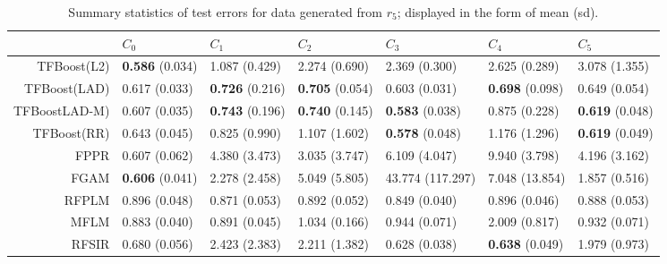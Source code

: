 \begin{table}[H]
\footnotesize
\centering
\begin{tabular}{rllllll}
  \hline
 & $C_0$ & $C_1$ & $C_2$ & $C_3$ & $C_4$ & $C_5$ \\ 
  \hline
TFBoost(L2) & \textbf{0.586} (0.034) & 1.087 (0.429) & 2.274 (0.690) & 2.369 (0.300) & 2.625 (0.289) & 3.078 (1.355) \\ 
  TFBoost(LAD) & 0.617 (0.033) & \textbf{0.726} (0.216) & \textbf{0.705} (0.054) & 0.603 (0.031) & \textbf{0.698} (0.098) & 0.649 (0.054) \\ 
  TFBoostLAD-M) & 0.607 (0.035) & \textbf{0.743} (0.196) & \textbf{0.740} (0.145) & \textbf{0.583} (0.038) & 0.875 (0.228) & \textbf{0.619} (0.048) \\ 
  TFBoost(RR) & 0.643 (0.045) & 0.825 (0.990) & 1.107 (1.602) & \textbf{0.578} (0.048) & 1.176 (1.296) & \textbf{0.619} (0.049) \\ 
  FPPR & 0.607 (0.062) & 4.380 (3.473) & 3.035 (3.747) & 6.109 (4.047) & 9.940 (3.798) & 4.196 (3.162) \\ 
  FGAM & \textbf{0.606} (0.041) & 2.278 (2.458) & 5.049 (5.805) & 43.774 (117.297) & 7.048 (13.854) & 1.857 (0.516) \\ 
  RFPLM & 0.896 (0.048) & 0.871 (0.053) & 0.892 (0.052) & 0.849 (0.040) & 0.896 (0.046) & 0.888 (0.053) \\ 
  MFLM & 0.883 (0.040) & 0.891 (0.045) & 1.034 (0.166) & 0.944 (0.071) & 2.009 (0.817) & 0.932 (0.071) \\ 
  RFSIR & 0.680 (0.056) & 2.423 (2.383) & 2.211 (1.382) & 0.628 (0.038) & \textbf{0.638} (0.049) & 1.979 (0.973) \\ 
   \hline
\end{tabular}
\caption{Summary statistics of test errors for data generated from $r_5$; displayed in the form of mean (sd).} 
\end{table}
